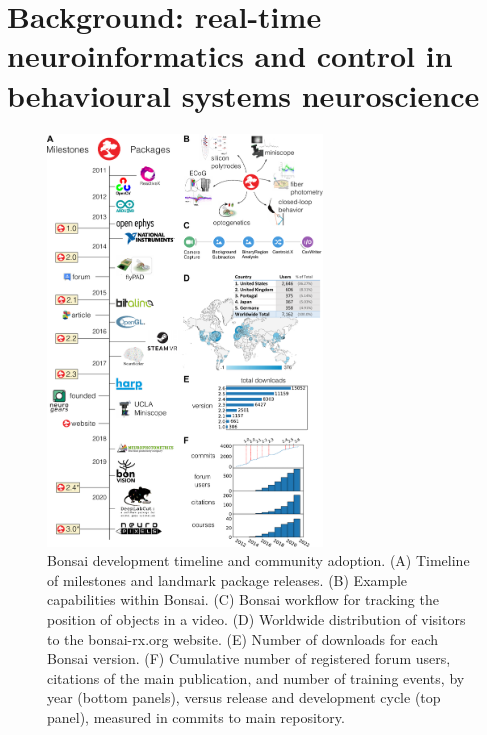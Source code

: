 \section{Background: real-time neuroinformatics and control in behavioural systems
  neuroscience}
  
\setlength{\columnsep}{0.5em}
\setlength{\intextsep}{0pt}
\begin{figure}
    \includegraphics[width=0.65\textwidth]{figures/roadmap-bbsrc-3x.pdf}%
  \caption{Bonsai development timeline and community adoption. (A) Timeline of
    milestones and landmark package releases. (B) Example capabilities 
    within Bonsai. (C) Bonsai workflow for tracking the position of objects
    in a video. (D) Worldwide
    distribution of visitors to the bonsai-rx.org website. (E)
    Number of downloads for each Bonsai version. (F) Cumulative number of
    registered forum users, citations of the main publication, and number of
    training events, by year (bottom panels), versus release and development
    cycle (top panel), measured in commits to main repository.}%
  \label{fig:bonsai}%
\end{figure}

